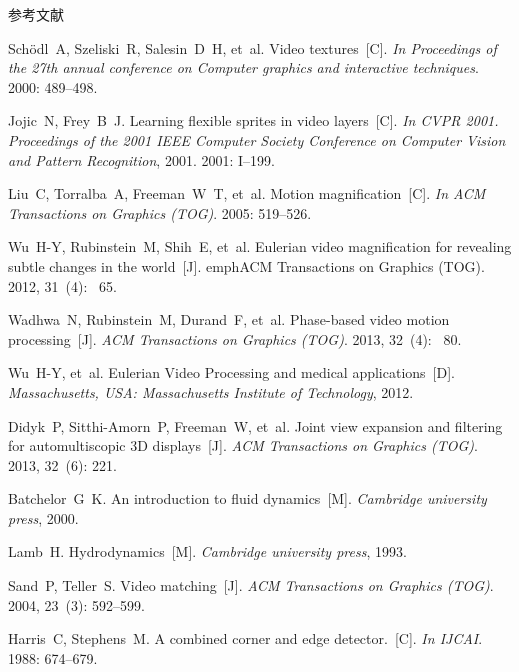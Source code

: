 \documentclass[xcolor=svgnames,serif,table,10pt]{beamer}
\begin{document}
\begin{frame}[allowframebreaks]{参考文献}
\begin{thebibliography}{10}
Sch{\"o}dl~A, Szeliski~R, Salesin~D~H, et~al.
\newblock Video textures~[C].
\newblock \emph{In Proceedings of the 27th annual conference on Computer graphics and
  interactive techniques}.
2000:  489--498.

Jojic~N, Frey~B~J.
\newblock Learning flexible sprites in video layers~[C].
\newblock \emph{In CVPR 2001. Proceedings of the 2001 IEEE Computer Society Conference on
  Computer Vision and Pattern Recognition}, 2001.
2001:  I--199.

Liu~C, Torralba~A, Freeman~W~T, et~al.
\newblock Motion magnification~[C].
\newblock \emph{In ACM Transactions on Graphics (TOG)}. 2005:  519--526.

Wu~H-Y, Rubinstein~M, Shih~E, et~al.
\newblock Eulerian video magnification for revealing subtle changes in the world~[J].
\newblock emph{ACM Transactions on Graphics (TOG)}. 2012, 31~(4): ~65.

Wadhwa~N, Rubinstein~M, Durand~F, et~al.
\newblock Phase-based video motion processing~[J].
\newblock \emph{ACM Transactions on Graphics (TOG)}. 2013, 32~(4): ~80.

{\beamertemplatebookbibitems
{}
Wu~H-Y, et~al.
\newblock Eulerian Video Processing and medical applications~[D].
\newblock \emph{Massachusetts, USA: Massachusetts Institute of Technology}, 2012.}

Didyk~P, Sitthi-Amorn~P, Freeman~W, et~al.
\newblock Joint view expansion and filtering for automultiscopic 3D displays~[J].
\newblock \emph{ACM Transactions on Graphics (TOG)}.
2013, 32~(6):  221.

{\beamertemplatebookbibitems
{}
Batchelor~G~K.
\newblock An introduction to fluid dynamics~[M].
\newblock \emph{Cambridge university press}, 2000.}

{\beamertemplatebookbibitems
{}
Lamb~H.
\newblock Hydrodynamics~[M].
\newblock \emph{Cambridge university press}, 1993.}

Sand~P, Teller~S.
\newblock Video matching~[J].
\newblock \emph{ACM Transactions on Graphics (TOG)}.
2004, 23~(3):  592--599.

Harris~C, Stephens~M.
\newblock A combined corner and edge detector.~[C].
\newblock \emph{In IJCAI}.
1988:  674--679.


\end{thebibliography}
\end{frame}
\end{document}
